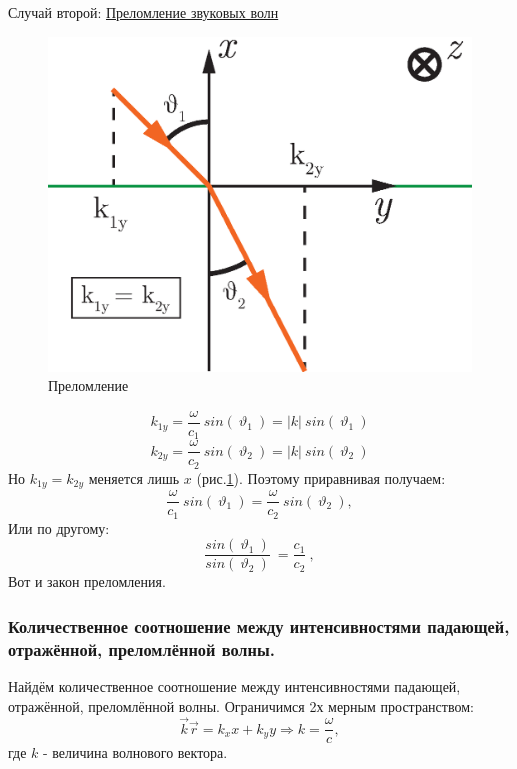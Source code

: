 \documentclass[14pt,a4paper,oneside]{extarticle}	%
\begin{document}
Случай второй: \underline{Преломление звуковых волн}
\begin{figure}[h!] 	%
	\centering 		%
	\includegraphics[width=12cm]{5.eps} %
	\caption{Преломление}
	\label{fig::5}
\end{figure}

\begin{equation*}
k_{1y} = \frac{\omega}{c_{1}}\: sin(\: \vartheta_{1}\:) =  |k|\: sin(\: \vartheta_{1}\:)
\end{equation*}
\begin{equation*}
k_{2y} = \frac{\omega}{c_{2}}\: sin(\: \vartheta_{2}\:) =  |k|\: sin(\: \vartheta_{2}\:)
\end{equation*}
Но $ k_{1y} = k_{2y} $ меняется лишь $ x $  (рис.\ref{fig::5}). Поэтому приравнивая получаем:
\begin{equation*}
\frac{\omega}{c_{1}}\: sin(\: \vartheta_{1}\:) = \frac{\omega}{c_{2}}\: sin(\: \vartheta_{2}\:),
\end{equation*} 
Или по другому:
\begin{equation}\label{64}
\frac{sin(\: \vartheta_{1}\:)}{sin(\: \vartheta_{2}\:)}\:  = \frac{c_{1}}{c_{2}}\: ,
\end{equation}  
Вот и закон преломления.


\subsubsection*{Количественное соотношение между интенсивностями падающей, отражённой, преломлённой волны.} %
Найдём количественное соотношение между интенсивностями падающей, отражённой, преломлённой волны.  
Ограничимся 2х мерным пространством:
\begin{equation*}
\vec{k}\vec{r} = k_{x}x +k_{y}y \Rightarrow k  =\frac{\omega}{c},
\end{equation*} 
где $ k $ - величина волнового вектора.
\end{document}
